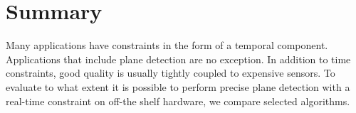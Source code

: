 \documentclass[main.tex]{subfiles}
\begin{document}

\section{Summary}
Many applications have constraints in the form of a temporal component. Applications that include plane detection
are no exception. In addition to time constraints, good quality is usually tightly coupled to expensive sensors.
To evaluate to what extent it is possible to perform precise plane detection with a real-time constraint on off-the shelf hardware,
we compare selected algorithms.
\end{document}
